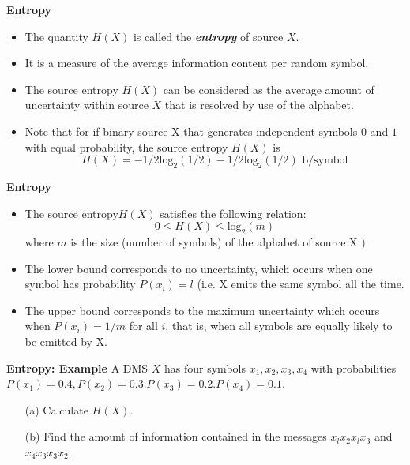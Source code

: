 \documentclass[a4]{beamer}
\begin{document}
\noindent \textbf{Entropy}
\begin{itemize}
\item The quantity $H(X)$ is called the \emph{\textbf{entropy}} of source $X$. \item It is a measure of the average information content per random symbol.
\item The source entropy $H(X)$ can be considered as the average amount of uncertainty
within source $X$ that is resolved by use of the alphabet.

\item Note that for if  binary source X that generates independent symbols $0$ and $1$ with equal probability, the source entropy $H(X)$ is
\[ H(X ) = -1/2 \mbox{log}_2 (1/2) - 1/2 \mbox{log}_2 (1/2) \mbox{   b/symbol}  \]
\end{itemize}




\noindent \textbf{Entropy}
\begin{itemize}
\item The source entropy$ H(X)$ satisfies the following relation:
\[0 \leq H(X) \leq \mbox{log}_2(m) \]where $m$ is the size (number of symbols) of the alphabet of source X ).
\item  The lower bound corresponds to no uncertainty, which occurs when one symbol has probability $P(x_i) = l$ (i.e. X emits the same symbol all the time.
\item The upper bound corresponds to the maximum uncertainty which occurs when $P(x_i) = 1 /m$ for all $i$. that is, when all symbols are equally likely to be emitted by X.
 \end{itemize}




\noindent \textbf{Entropy: Example}
A DMS $X$ has four symbols $x_1 , x_2, x_3, x_4$ with probabilities $P(x_1) = 0.4, P(x_2) = 0.3. P(x_3) = 0.2.
P(x_4) = 0.1$.
\begin{itemize}
\item[(a)] Calculate $H(X)$.
\item[(b)] Find the amount of information contained in the messages $x_lx_2x_lx_3$ and $x_4x_3x_3x_2$.
\end{itemize}
\end{document}
